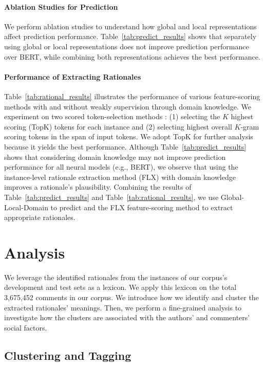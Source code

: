 \documentclass[letterpaper]{article} %
\begin{document}
\paragraph{Ablation Studies for Prediction}
We perform ablation studies to understand how global and local representations affect prediction performance.
Table~\ref{tab:predict_results} shows that separately using global or local representations does not improve prediction performance over BERT, while combining both representations achieves the best performance.

\paragraph{Performance of Extracting Rationales}
Table~\ref{tab:rational_results} illustrates the performance of various feature-scoring methods with and without weakly supervision through domain knowledge.
We experiment on two scored token-selection methods \cite{jain-2020-learning}: (1) selecting the $K$ highest scoring (TopK) tokens for each instance and (2) selecting highest overall $K$-gram scoring tokens in the span of input tokens.
We adopt TopK for further analysis because it yields the best performance.
Although Table~\ref{tab:predict_results} shows that considering domain knowledge may not improve prediction performance for all neural models (e.g., BERT), we observe that using the instance-level rationale extraction method (FLX) with domain knowledge improves a rationale's plausibility.
Combining the results of Table~\ref{tab:predict_results} and Table~\ref{tab:rational_results}, we use Global-Local-Domain to predict and the FLX feature-scoring method to extract appropriate rationales.

\section{Analysis}
We leverage the  identified rationales from the  instances of our corpus's development and test sets as a lexicon.
We apply this lexicon on the total 3,675,452 comments in our corpus.
We introduce how we identify and cluster the extracted rationales' meanings.
Then, we perform a fine-grained analysis to investigate how the clusters are associated with the authors' and commenters' social factors.

\subsection{Clustering and Tagging} 
\end{document}
